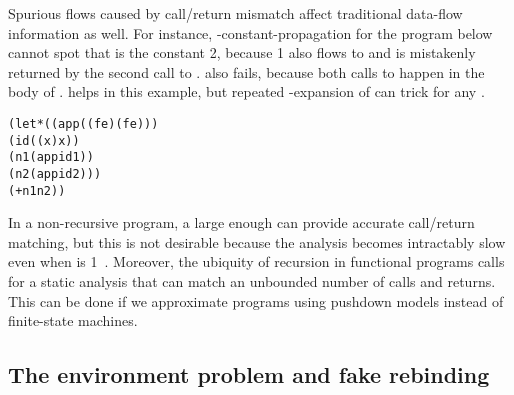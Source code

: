 \documentclass{LMCS}
\theoremstyle{definition} \newtheorem{property}[thm]{Property}
\begin{document}
Spurious flows caused by call/return mismatch affect traditional data-flow
information as well.
For instance, -constant-propagation for the program below
cannot spot that  is the constant 2,
because 1 also flows to  and is mistakenly returned by the second call to
.
 also fails, because both calls to  happen in the body of 
.
 helps in this example, but repeated -expansion of  can 
trick \kcfa{} for any .
\begin{center}
  \begin{minipage}{0.45\columnwidth}
    \begin{alltt}
(let* ((app (\lam(f e) (f e)))
       (id (\lam(x) x))
       (n1 (app id 1))
       (n2 (app id 2)))
  (+ n1 n2)) \end{alltt}    
  \end{minipage}
\end{center}

In a non-recursive program, a large enough  can provide accurate 
call/return matching, but this is not desirable because the analysis becomes
intractably slow even when  is 1~\cite{conf/icfp/08/vanhorn/kcfa}.
Moreover, the ubiquity of recursion in functional programs calls for a static
analysis that can match an unbounded number of calls and returns.
This can be done if we approximate programs using pushdown models instead of
finite-state machines.


\subsection{The environment problem and fake rebinding\label{sec:fake-rebind}}
\end{document}
